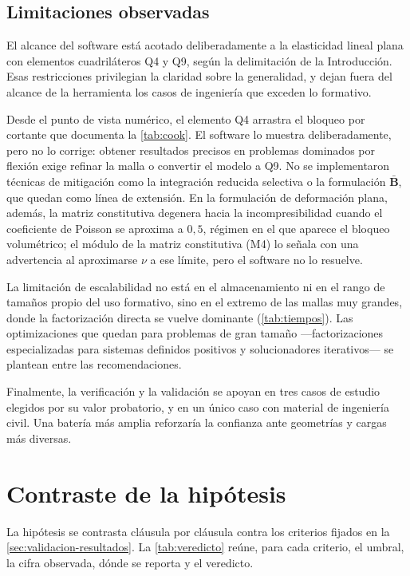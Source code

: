 \subsection{Limitaciones observadas}

El alcance del software está acotado deliberadamente a la elasticidad lineal plana con elementos cuadriláteros Q4 y Q9, según la delimitación de la Introducción. Esas restricciones privilegian la claridad sobre la generalidad, y dejan fuera del alcance de la herramienta los casos de ingeniería que exceden lo formativo.

Desde el punto de vista numérico, el elemento Q4 arrastra el bloqueo por cortante que documenta la \autoref{tab:cook}. El software lo muestra deliberadamente, pero no lo corrige: obtener resultados precisos en problemas dominados por flexión exige refinar la malla o convertir el modelo a Q9. No se implementaron técnicas de mitigación como la integración reducida selectiva o la formulación $\bar{\bm{B}}$, que quedan como línea de extensión. En la formulación de deformación plana, además, la matriz constitutiva degenera hacia la incompresibilidad cuando el coeficiente de Poisson se aproxima a $0{,}5$, régimen en el que aparece el bloqueo volumétrico; el módulo de la matriz constitutiva (M4) lo señala con una advertencia al aproximarse $\nu$ a ese límite, pero el software no lo resuelve.

La limitación de escalabilidad no está en el almacenamiento ni en el rango de tamaños propio del uso formativo, sino en el extremo de las mallas muy grandes, donde la factorización directa se vuelve dominante (\autoref{tab:tiempos}). Las optimizaciones que quedan para problemas de gran tamaño —factorizaciones especializadas para sistemas definidos positivos y solucionadores iterativos— se plantean entre las recomendaciones.

Finalmente, la verificación y la validación se apoyan en tres casos de estudio elegidos por su valor probatorio, y en un único caso con material de ingeniería civil. Una batería más amplia reforzaría la confianza ante geometrías y cargas más diversas.

\section{Contraste de la hipótesis}
\label{sec:validacion-hipotesis}

La hipótesis se contrasta cláusula por cláusula contra los criterios fijados en la \autoref{sec:validacion-resultados}. La \autoref{tab:veredicto} reúne, para cada criterio, el umbral, la cifra observada, dónde se reporta y el veredicto.

